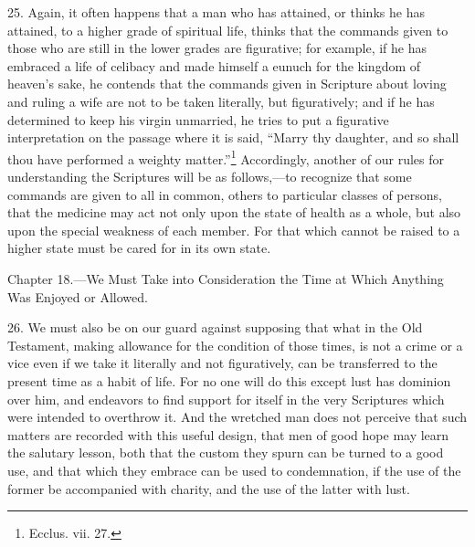 25. Again, it often happens that a man who has attained, or thinks he has attained, to a higher grade of spiritual life, thinks that the commands given to those who are still in the lower grades are figurative; for example, if he has embraced a life of celibacy and made himself a eunuch for the kingdom of heaven’s sake, he contends that the commands given in Scripture about loving and ruling a wife are not to be taken literally, but figuratively; and if he has determined to keep his virgin unmarried, he tries to put a figurative interpretation on the passage where it is said, “Marry thy daughter, and so shall thou have performed a weighty matter.”\footnote{Ecclus. vii. 27.} Accordingly, another of our rules for understanding the Scriptures will be as follows,—to recognize that some commands are given to all in common, others to particular classes of persons, that the medicine may act not only upon the state of health as a whole, but also upon the special weakness of each member. For that which cannot be raised to a higher state must be cared for in its own state.


Chapter 18.—We Must Take into Consideration the Time at Which Anything Was Enjoyed or Allowed.

26. We must also be on our guard against supposing that what in the Old Testament, making allowance for the condition of those times, is not a crime or a vice even if we take it literally and not figuratively, can be transferred to the present time as a habit of life. For no one will do this except lust has dominion over him, and endeavors to find support for itself in the very Scriptures which were intended to overthrow it. And the wretched man does not perceive that such matters are recorded with this useful design, that men of good hope may learn the salutary lesson, both that the custom they spurn can be turned to a good use, and that which they embrace can be used to condemnation, if the use of the former be accompanied with charity, and the use of the latter with lust.

